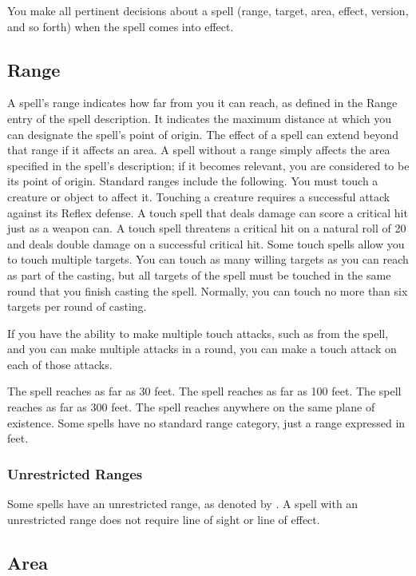 You make all pertinent decisions about a spell (range, target, area, effect, version, and so forth) when the spell comes into effect.

\subsection{Range}
A spell's range indicates how far from you it can reach, as defined in the Range entry of the spell description. It indicates the maximum distance at which you can designate the spell's point of origin. The effect of a spell can extend beyond that range if it affects an area. A spell without a range simply affects the area specified in the spell's description; if it becomes relevant, you are considered to be its point of origin. Standard ranges include the following.
 You must touch a creature or object to affect it. Touching a creature requires a successful attack against its Reflex defense. A touch spell that deals damage can score a critical hit just as a weapon can. A touch spell threatens a critical hit on a natural roll of 20 and deals double damage on a successful critical hit. Some touch spells allow you to touch multiple targets. You can touch as many willing targets as you can reach as part of the casting, but all targets of the spell must be touched in the same round that you finish casting the spell. Normally, you can touch no more than six targets per round of casting.

If you have the ability to make multiple touch attacks, such as from the  spell, and you can make multiple attacks in a round, you can make a touch attack on each of those attacks.

 The spell reaches as far as 30 feet.
 The spell reaches as far as 100 feet.
 The spell reaches as far as 300 feet.
 The spell reaches anywhere on the same plane of existence.
 Some spells have no standard range category, just a range expressed in feet.

\subsubsection{Unrestricted Ranges}

Some spells have an unrestricted range, as denoted by \rngunrestricted. A spell with an unrestricted range does not require line of sight or line of effect.

\subsection{Area}\label{Spell Area}

